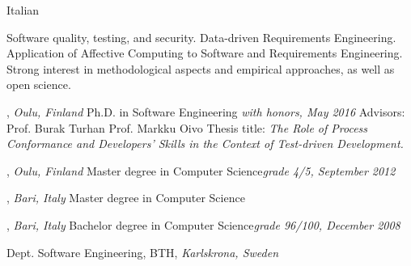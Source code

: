 \documentclass[9pt]{article}
\begin{document}
\bigskip
\bigskip
\bigskip
\flushleft
%

\medskip
\bigskip

{}

\noindent Italian

\medskip

\textheight=580pt

\noindent Software quality, testing, and security. Data-driven Requirements Engineering. Application of Affective Computing to Software and Requirements Engineering.
Strong interest in methodological aspects and empirical approaches, as well as open science.
\bigskip
\medskip



, \emph{Oulu, Finland} \vspace{0.01in} 
\newline Ph.D. in Software Engineering {\em with honors, May 2016}
\newline Advisors: Prof. Burak Turhan \amper{} Prof. Markku Oivo
\newline Thesis title: {\em The Role of Process Conformance and Developers' Skills in the Context of Test-driven Development.}

\bigskip


, \emph{Oulu, Finland} \vspace{0.01in}  
\newline\noindent Master degree in Computer Science{\em grade 4/5, September 2012}

\bigskip

, \emph{Bari, Italy} \vspace{0.01in}  
\newline\noindent Master degree in Computer Science


\bigskip

, \emph{Bari, Italy} \vspace{0.01in}  
\newline\noindent Bachelor degree in Computer Science{\em grade 96/100, December 2008}

\bigskip
\medskip
{}
\noindent Dept. Software Engineering, BTH, \emph{Karlskrona, Sweden} \vspace{0.01in} 
\newline{}
\bigskip
\end{document}
